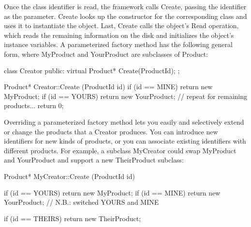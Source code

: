 \documentclass{report}
\begin{document}
\begin{itemize}
\begin{enumerate}
                    \bigbreak \noindent 
                    Once the class identifier is read, the framework calls Create, passing the identifier as the parameter. Create looks up the constructor for the corresponding class and uses it to instantiate the object. Last, Create calls the object's Read operation, which reads the remaining information on the disk and initializes the object's instance variables. A parameterized factory method has the following general form, where
                    \bigbreak \noindent 
                    MyProduct and YourProduct are subclasses of Product:
                    \bigbreak \noindent 
                    \begin{cppcode}
                        class Creator {
                            public:
                            virtual Product* Create(ProductId);
                        };

                        Product* Creator::Create (ProductId id) {
                            if (id == MINE) return new MyProduct;
                            if (id == YOURS) return new YourProduct;
                            // repeat for remaining products...
                            return 0;
                        }
                    \end{cppcode}
                    \bigbreak \noindent 
                    Overriding a parameterized factory method lets you easily and selectively extend or change the products that a Creator produces. You can introduce new identifiers for new kinds of products, or you can associate existing identifiers with different products.
                    \bigbreak \noindent 
                    For example, a subclass MyCreator could swap MyProduct and YourProduct and support a new TheirProduct subclass:
                    \bigbreak \noindent 
                    \begin{cppcode}
                        Product* MyCreator::Create (ProductId id) {
                            if (id == YOURS) return new MyProduct;
                            if (id == MINE) return new YourProduct;
                            // N.B.: switched YOURS and MINE

                            if (id == THEIRS) return new TheirProduct;

}
\end{cppcode}
\end{enumerate}
\end{itemize}
\end{document}
